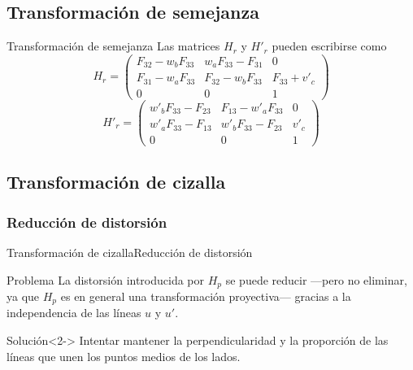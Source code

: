 \documentclass[aspectratio=169,14pt,spanish]{beamer}
\begin{document}
      \subsection{Transformación de semejanza}

        \begin{frame}{Transformación de semejanza}
            Las matrices $H_r$ y $H'_r$ pueden escribirse como
            \[
            H_r = \begin{pmatrix}
                F_{32} - w_b F_{33} & w_a F_{33} - F_{31} & 0 \\
                F_{31} - w_a F_{33} & F_{32} - w_b F_{33} & F_{33} + v'_c \\
                0 & 0 & 1
            \end{pmatrix}
            \]
            \[
            H'_r = \begin{pmatrix}
                w'_b F_{33} - F_{23} & F_{13} - w'_a F_{33} & 0 \\
                w'_a F_{33} - F_{13} & w'_b F_{33} - F_{23} & v'_c \\
                0 & 0 & 1
            \end{pmatrix}
            \]

             
        \end{frame}

      \subsection{Transformación de cizalla}

        \subsubsection{Reducción de distorsión}
          \begin{frame}{Transformación de cizalla}{Reducción de distorsión}
              \begin{alertblock}{Problema}
                  La distorsión introducida por $H_p$ se puede reducir ---pero no eliminar, ya que $H_p$ es en general una transformación proyectiva--- gracias a la independencia de las líneas $u$ y $u'$.
              \end{alertblock}

              \begin{alertblock}{Solución}<2->
                  Intentar mantener la perpendicularidad y la proporción de las líneas que unen los puntos medios de los lados.
              \end{alertblock}
          \end{frame}
\end{document}
